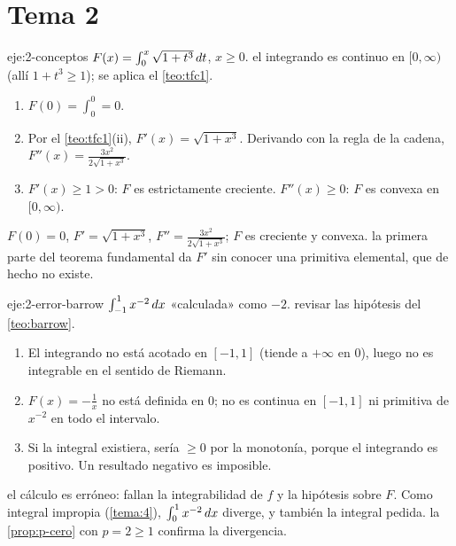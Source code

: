 \section{Tema 2}

\begin{solucion}{eje:2-conceptos}
\datos $F(x)=\int_0^{x}\sqrt{1+t^{3}}\mathop{}\!d t$, $x\ge0$.
\planteamiento el integrando es continuo en $[0,\infty)$ (allí $1+t^{3}\ge1$); se aplica el \cref{teo:tfc1}.
\pasos
\begin{enumerate}[label=(\alph*)]
  \item $F(0)=\int_0^{0}=0$.
  \item Por el \cref{teo:tfc1}(ii), $F'(x)=\sqrt{1+x^{3}}$. Derivando con la regla de la cadena, $F''(x)=\frac{3x^{2}}{2\sqrt{1+x^{3}}}$.
  \item $F'(x)\ge1>0$: $F$ es estrictamente creciente. $F''(x)\ge0$: $F$ es convexa en $[0,\infty)$.
\end{enumerate}
\resultado $F(0)=0$, $F'=\sqrt{1+x^{3}}$, $F''=\frac{3x^{2}}{2\sqrt{1+x^{3}}}$; $F$ es creciente y convexa.
\comprobacion la primera parte del teorema fundamental da $F'$ sin conocer una primitiva elemental, que de hecho no existe.
\end{solucion}

\begin{solucion}{eje:2-error-barrow}
\datos $\int_{-1}^{1}x^{-2}\mathop{}\!d x$ «calculada» como $-2$.
\planteamiento revisar las hipótesis del \cref{teo:barrow}.
\pasos
\begin{enumerate}[label=\arabic*.]
  \item El integrando no está acotado en $[-1,1]$ (tiende a $+\infty$ en $0$), luego no es integrable en el sentido de Riemann.
  \item $F(x)=-\frac1x$ no está definida en $0$; no es continua en $[-1,1]$ ni primitiva de $x^{-2}$ en todo el intervalo.
  \item Si la integral existiera, sería $\ge0$ por la monotonía, porque el integrando es positivo. Un resultado negativo es imposible.
\end{enumerate}
\resultado el cálculo es erróneo: fallan la integrabilidad de $f$ y la hipótesis sobre $F$. Como integral impropia (\cref{tema:4}), $\int_0^{1}x^{-2}\mathop{}\!d x$ diverge, y también la integral pedida.
\comprobacion la \cref{prop:p-cero} con $p=2\ge1$ confirma la divergencia.
\end{solucion}

